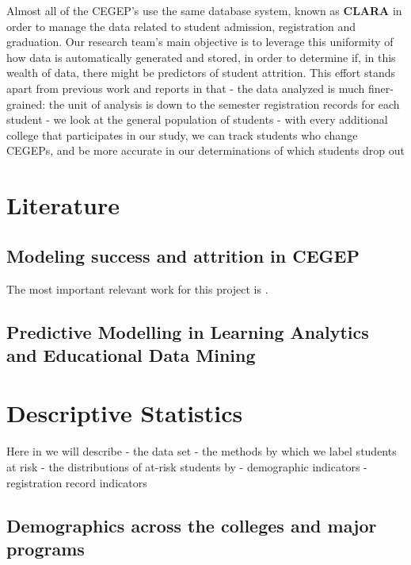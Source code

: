 \documentclass[]{book}
\theoremstyle{definition}
\theoremstyle{definition}
\theoremstyle{remark}
\begin{document}
Almost all of the CEGEP's use the same database system, known as
\textbf{CLARA} in order to manage the data related to student admission,
registration and graduation. Our research team's main objective is to
leverage this uniformity of how data is automatically generated and
stored, in order to determine if, in this wealth of data, there might be
predictors of student attrition. This effort stands apart from previous
work and reports in that - the data analyzed is much finer-grained: the
unit of analysis is down to the semester registration records for each
student - we look at the general population of students - with every
additional college that participates in our study, we can track students
who change CEGEPs, and be more accurate in our determinations of which
students drop out

\chapter{Literature}\label{literature}

\section{Modeling success and attrition in
CEGEP}\label{modeling-success-and-attrition-in-cegep}

The most important relevant work for this project is
\citep{jorgensen_predicting_2009}.

\section{Predictive Modelling in Learning Analytics and Educational Data
Mining}\label{predictive-modelling-in-learning-analytics-and-educational-data-mining}

\citep{hla2017}

\chapter{Descriptive Statistics}\label{descriptive-statistics}

Here in we will describe - the data set - the methods by which we label
students at risk - the distributions of at-risk students by -
demographic indicators - registration record indicators

\section{Demographics across the colleges and major
programs}\label{demographics-across-the-colleges-and-major-programs}
\end{document}
